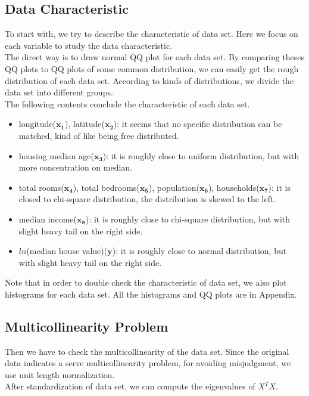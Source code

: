 \documentclass[12pt,a4paper]{article}
\begin{document}
\subsection{Data Characteristic}
\qquad To start with, we try to describe the characteristic of data set. Here we focus on each variable to study the data characteristic.\\
\indent The direct way is to draw normal QQ plot for each data set. By comparing theses QQ plots to QQ plots of some common distribution, we can easily get the rough distribution of each data set. According to kinds of distributions, we divide the data set into different groups.\\
\indent The following contents conclude the characteristic of each data set.
\begin{itemize}
	\item longitude($\bm{x_{1}}$), latitude($\bm{x_{2}}$): it seems that no specific distribution can be matched, kind of like being free distributed.
	\item housing median age($\bm{x_{3}}$): it is roughly close to uniform distribution, but with more concentration on median.
	\item total rooms($\bm{x_{4}}$), total bedrooms($\bm{x_{5}}$), population($\bm{x_{6}}$), households($\bm{x_{7}}$): it is closed to chi-square distribution, the distribution is skewed to the left.
	\item median income($\bm{x_{8}}$): it is roughly close to chi-square distribution, but with slight heavy tail on the right side.
	\item $ln$(median house value)($\bm{y}$): it is roughly close to normal distribution, but with slight heavy tail on the right side.
\end{itemize}
Note that in order to double check the characteristic of data set, we also plot histograms for each data set. All the histograms and QQ plots are in Appendix.


\subsection{Multicollinearity Problem}
\qquad Then we have to check the multicollinearity of the data set. Since the original data indicates a serve multicollinearity problem, for avoiding misjudgment, we use unit length normalization.\\
\indent After standardization of data set, we can compute the eigenvalues of $X^{T}X$.
\end{document}
